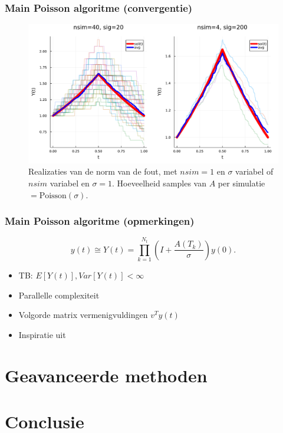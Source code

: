\documentclass[18pt,aspectratio=149]{beamer}
\begin{document}
\begin{frame}
    \frametitle{Main Poisson algoritme (convergentie)}
    \begin{figure}[h!]
        \centering
        \includegraphics[width=\textwidth]{imgs/convergence_main_poisson.pdf}
        \caption{Realizaties van de norm van de fout,
            met $nsim =1$ en $\sigma$ variabel of $nsim$ variabel en $\sigma = 1$.
            Hoeveelheid samples van $A$ per simulatie $= \text{Poisson}(\sigma)$.
        }
        \label{fig:imgs/main poisson convergentie}
    \end{figure}
\end{frame}

\begin{frame}
    \frametitle{Main Poisson algoritme (opmerkingen)}
    \begin{equation}
        y(t) \cong Y(t) =  \prod_{k=1}^{N_{t}}\left(I + \frac{A(T_{k})}{\sigma} \right)    y(0).
    \end{equation}
    \begin{itemize}
        \item TB: $E[Y(t)],Var[Y(t)]< \infty$
        \item Parallelle complexiteit
        \item Volgorde matrix vermenigvuldingen $v^{T}y(t)$
        \item Inspiratie uit \cite{acebron_monte_2016}
    \end{itemize}
\end{frame}

\section{Geavanceerde methoden}

\section{Conclusie}
\end{document}
